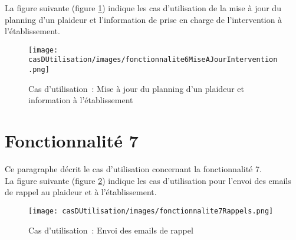 La figure suivante (figure \ref{diagrammeCasUtilisation6}) indique les cas d'utilisation de la mise à jour du planning d'un plaideur et l'information de prise en charge de l'intervention à l'établissement.
\begin{figure}[H]
	\centering
	\texttt{[image: casDUtilisation/images/fonctionnalite6MiseAJourIntervention.png]}
	\caption{Cas d'utilisation~: Mise à jour du planning d'un plaideur et information à l'établissement}
	\label{diagrammeCasUtilisation6}
\end{figure}




\section{Fonctionnalité 7}
Ce paragraphe décrit le cas d'utilisation concernant la fonctionnalité 7.\\

La figure suivante (figure \ref{diagrammeCasUtilisation7}) indique les cas d'utilisation pour l'envoi des emails de rappel au plaideur et à l'établissement.
\begin{figure}[H]
	\centering
	\texttt{[image: casDUtilisation/images/fonctionnalite7Rappels.png]}
	\caption{Cas d'utilisation~: Envoi des emails de rappel}
	\label{diagrammeCasUtilisation7}
\end{figure}